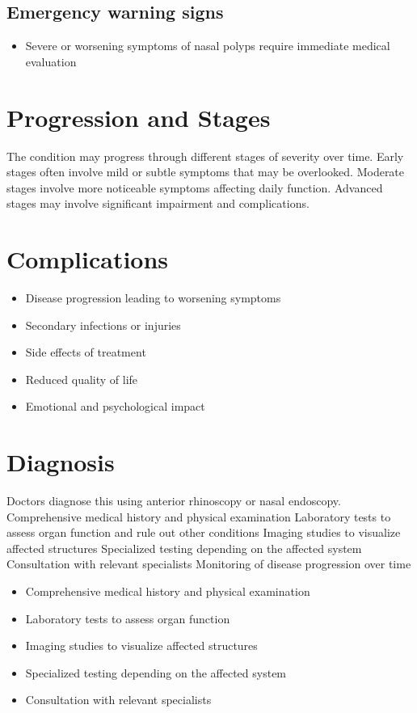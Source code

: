\subsection{Emergency warning signs}
\begin{itemize}[noitemsep]
  \item Severe or worsening symptoms of nasal polyps require immediate medical evaluation
\end{itemize}
\section{Progression and Stages}
The condition may progress through different stages of severity over time. Early stages often involve mild or subtle symptoms that may be overlooked. Moderate stages involve more noticeable symptoms affecting daily function. Advanced stages may involve significant impairment and complications.
\section{Complications}
\begin{itemize}[noitemsep]
  \item Disease progression leading to worsening symptoms
  \item Secondary infections or injuries
  \item Side effects of treatment
  \item Reduced quality of life
  \item Emotional and psychological impact
\end{itemize}
\section{Diagnosis}
Doctors diagnose this using anterior rhinoscopy or nasal endoscopy. Comprehensive medical history and physical examination Laboratory tests to assess organ function and rule out other conditions Imaging studies to visualize affected structures Specialized testing depending on the affected system Consultation with relevant specialists Monitoring of disease progression over time

\begin{itemize}[noitemsep]
  \item Comprehensive medical history and physical examination
  \item Laboratory tests to assess organ function
  \item Imaging studies to visualize affected structures
  \item Specialized testing depending on the affected system
  \item Consultation with relevant specialists
\end{itemize}
